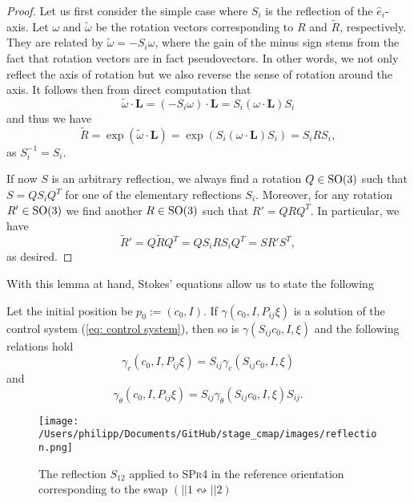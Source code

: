 \begin{proof}
Let us first consider the simple case where $S_i$ is the reflection of the $\hat{e}_i$-axis. Let $\omega$ and $\tilde{\omega}$ be the rotation vectors corresponding to $R$ and $\tilde{R}$, respectively. They are related by $\tilde{\omega} = -S_i \omega$, where the gain of the minus sign stems from the fact that rotation vectors are in fact pseudovectors. In other words, we not only reflect the axis of rotation but we also reverse the sense of rotation around the axis. It follows then from direct computation that
\begin{equation}
\label{eq: transformation of rotation axis}
 \tilde{\omega} \cdot \mathbf{L} = (-S_i\omega) \cdot \mathbf{L} = S_i(\omega \cdot \mathbf{L})S_i
\end{equation}
and thus we have
\begin{equation}
\tilde{R} = \exp(\tilde{\omega} \cdot \mathbf{L}) = \exp(S_i(\omega \cdot \mathbf{L})S_i) = S_iRS_i,
\end{equation}
as $S_i^{-1} = S_i$.

If now $S$ is an arbitrary reflection, we always find a rotation $Q \in \operatorname{SO}(3)$ such that $S = Q S_i Q^T$ for one of the elementary reflections $S_i$. Moreover, for any rotation $R' \in \operatorname{SO}(3)$ we find another $R \in \operatorname{SO}(3)$ such that $R' = Q R Q^T$. In particular, we have
\begin{equation}
\tilde{R}' = Q \tilde{R} Q^T = Q S_iRS_i Q^T = S R' S^T,
\end{equation}
as desired.
\end{proof}

With this lemma at hand, Stokes' equations allow us to state the following

\begin{condition}
\label{cond:swap}
Let the initial position be $p_0 := (c_0, I)$. If $\gamma(c_0, I, P_{ij} \xi)$ is a solution of the control system (\ref{eq: control system}), then so is $\gamma(S_{ij}c_0, I, \xi)$ and the following relations hold
\begin{equation}
	\gamma_c(c_0, I, P_{ij} \xi) = S_{ij} \gamma_c(S_{ij}c_0, I, \xi)
\end{equation}
and
\begin{equation}
	\gamma_{\theta}(c_0, I, P_{ij} \xi ) = S_{ij} \gamma_{\theta} (S_{ij} c_0, I, \xi) S_{ij}.
\end{equation}
\end{condition}

\begin{figure}[h]
\centering
\texttt{[image: /Users/philipp/Documents/GitHub/stage\_cmap/images/reflection.png]}
\caption{The reflection $S_{12}$ applied to \textsc{SPr4} in the reference orientation corresponding to the swap $(||1 \leftrightsquigarrow ||2)$ }
\label{fig:reflection of swimmer}
\end{figure}

